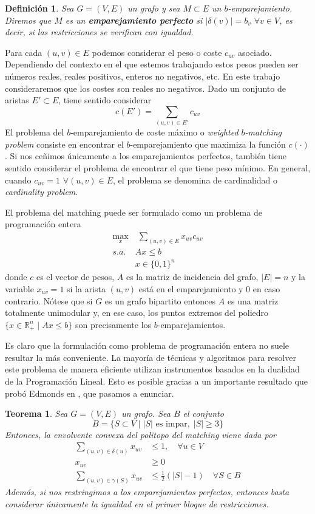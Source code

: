 \documentclass[twoside,a4paper,openright,12pt,tikz]{book}
\newtheorem{defi}{Definici\'on}[section]
\newtheorem{thm}{Teorema}[section]
\newcommand{\R}{\mathbb{R}}
\begin{document}
\begin{defi}
Sea $G=(V,E)$ un grafo y sea $M\subset E$ un $b$-emparejamiento. Diremos que $M$ es un \textbf{emparejamiento perfecto} si $|\delta(v)|=b_v$ $\forall v \in V$, es decir, si las restricciones se verifican con igualdad.
\end{defi}
Para cada $(u,v)\in E$ podemos considerar el peso o coste $c_{uv}$ asociado. Dependiendo del contexto en el que estemos trabajando estos pesos pueden ser números reales, reales positivos, enteros no negativos, etc. En este trabajo consideraremos que los costes son reales no negativos. Dado un conjunto de aristas $E'\subset E$, tiene sentido considerar
$$
c(E')=\sum_{(u,v)\in E'} c_{uv}
$$
El problema del $b$-emparejamiento de coste máximo o \textit{weighted $b$-matching problem} consiste en encontrar el $b$-emparejamiento que maximiza la función $c(\cdot)$. Si nos ceñimos únicamente a los emparejamientos perfectos, también tiene sentido considerar el problema de encontrar el que tiene peso mínimo. En general, cuando $c_{uv}=1$ $\forall (u,v)\in E$, el problema se denomina de cardinalidad o \textit{cardinality problem}.

El problema del matching puede ser formulado como un problema de programación entera
\begin{align*}
\max_{x} &\; \sum_{(u,v)\in E} x_{uv}c_{uv}  \nonumber\\ 
s.a.\;  &  Ax\leq b \\
& x\in\{0,1\}^n\nonumber
\end{align*}
donde $c$ es el vector de pesos, $A$ es la matriz de incidencia del grafo, $|E|=n$ y la variable $x_{uv}=1$ si la arista $(u,v)$ está en el emparejamiento y $0$ en caso contrario. Nótese que si $G$ es un grafo bipartito entonces $A$ es una matriz totalmente unimodular y, en ese caso, los puntos extremos del poliedro $\{x \in \R^n_+\mid Ax\leq b\}$ son precisamente los $b$-emparejamientos.

Es claro que la formulación como problema de programación entera no suele resultar la más conveniente. La mayoría de técnicas y algoritmos para resolver este problema de manera eficiente utilizan instrumentos basados en la dualidad de la Programación Lineal. Esto es posible gracias a un importante resultado que probó Edmonds en \cite{edmond}, que pasamos a enunciar.
\begin{thm}
Sea $G=(V,E)$ un grafo. Sea $B$ el conjunto
$$
B = \{S\subset V \mid |S| \text{ es impar},\;|S|\geq 3\}
$$
Entonces, la envolvente convexa del politopo del matching viene dada por
\begin{align*}
\sum_{(u,v)\in\delta(u)} x_{uv} &\leq 1, \quad \forall u\in V\\
x_{uv} &\geq 0\\
\sum_{(u,v)\in \gamma(S)} x_{uv}& \leq \frac{1}{2}(|S|-1)\quad \forall S \in B	
\end{align*}
Además, si nos restringimos a los emparejamientos perfectos, entonces basta considerar únicamente la igualdad en el primer bloque de restricciones.
\end{thm}
\end{document}
